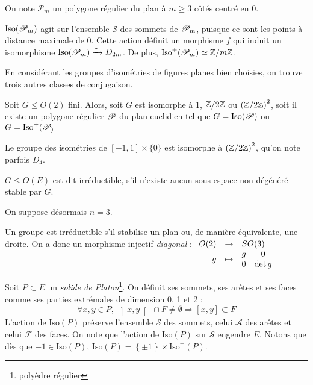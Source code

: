 \documentclass{cours}
\begin{document}
\begin{definition}
    On note $\mathscr{P}_{m}$ un polygone régulier du plan à $m \geq 3$ côtés centré en $0$.
\end{definition}

\begin{proposition}
    $\text{Iso}(\mathscr{P}_{m})$ agit sur l'ensemble $\mathscr{S}$ des sommets de $\mathscr{P}_{m}$, puisque ce sont les points à distance maximale de $0$. Cette action définit un morphisme $f$ qui induit un isomorphisme $\text{Iso}(\mathscr{P}_{m}) \xrightarrow{\sim} D_{2m}$. De plus, $\text{Iso}^{+}(\mathscr{P}_{m}) \simeq \mathbb{Z}/m\mathbb{Z}$.
\end{proposition}

En considérant les groupes d'isométries de figures planes bien choisies, on trouve trois autres classes de conjugaison.

\begin{proposition}
    Soit $G \leq O(2)$ fini. Alors, soit $G$ est isomorphe à $1$, $\mathbb{Z}/2\mathbb{Z}$ ou $\left(\mathbb{Z}/2\mathbb{Z}\right)^{2}$, soit il existe un polygone régulier $\mathscr{P}_{}$ du plan euclidien tel que $G = \text{Iso}(\mathscr{P}_{})$ ou $G = \text{Iso}^{+}(\mathscr{P}_{)}$
\end{proposition}
\begin{remark}
    Le groupe des isométries de $\left[-1, 1\right] \times \{0\}$ est isomorphe à $\left(\mathbb{Z}/2\mathbb{Z}\right)^{2}$, qu'on note parfois $D_{4}$.
\end{remark}

\begin{definition}
    $G \leq O(E)$ est dit irréductible, s'il n'existe aucun sous-espace non-dégénéré stable par $G$.
\end{definition}

On suppose désormais $n = 3$.

\begin{remark}
    Un groupe est irréductible s'il stabilise un plan ou, de manière équivalente, une droite. On a donc un morphisme injectif \emph{diagonal} :
    $\begin{array}[t]{rcl} O(2) & \to & SO(3) \\ g & \mapsto & \begin{matrix}g & 0\\ 0 & \det g\end{matrix} \end{array}$
\end{remark}

\begin{definition}
    Soit $P \subset E$ un \emph{solide de Platon}\footnote{polyèdre régulier}. On définit ses sommets, ses arêtes et ses faces comme ses parties extrémales de dimension 0, 1 et 2 :
    \[
        \forall x, y \in P, \ \left]x, y \right[\ \cap F \neq \emptyset \Rightarrow \left[x, y\right]\subset F
    \]
    L'action de $\text{Iso}(P)$ préserve l'ensemble $\mathscr{S}$ des sommets, celui $\mathscr{A}$ des arêtes et celui $\mathscr{F}$ des faces. On note que l'action de $\text{Iso}(P)$ sur $\mathscr{S}$ engendre $E$. Notons que dès que $-1 \in \text{Iso}(P)$, $\text{Iso}(P) = \left\{\pm 1\right\} \times \text{Iso}^{+}(P)$.
\end{definition}
\end{document}
